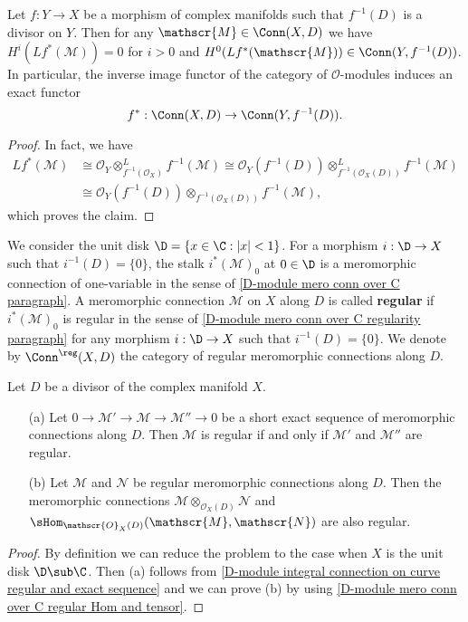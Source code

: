 \begin{proposition}\label{D-module mero conn inverse image exact}
Let $f:Y\to X$ be a morphism of complex manifolds such that $f^{-1}(D)$ is a divisor on $Y$. Then for any $\mathscr{M}\in\Conn(X,D)$ we have $H^i(Lf^*(\mathscr{M}))=0$ for $i>0$ and $H^0(Lf^*(\mathscr{M}))\in\Conn(Y,f^{-1}(D))$. In particular, the inverse image functor of the category of $\mathscr{O}$-modules induces an exact functor
\[f^*:\Conn(X,D)\to\Conn(Y,f^{-1}(D)).\]
\end{proposition}
\begin{proof}
In fact, we have
\begin{align*}
Lf^*(\mathscr{M})&\cong\mathscr{O}_Y\otimes_{f^{-1}(\mathscr{O}_X)}^Lf^{-1}(\mathscr{M})\cong\mathscr{O}_Y(f^{-1}(D))\otimes_{f^{-1}(\mathscr{O}_X(D))}^Lf^{-1}(\mathscr{M})\\
&\cong\mathscr{O}_Y(f^{-1}(D))\otimes_{f^{-1}(\mathscr{O}_X(D))}f^{-1}(\mathscr{M}),
\end{align*}
which proves the claim.
\end{proof}

We consider the unit disk $\D=\{x\in\C:|x|<1\}$. For a morphism $i:\D\to X$ such that $i^{-1}(D)=\{0\}$, the stalk $i^*(\mathscr{M})_0$ at $0\in\D$ is a meromorphic connection of one-variable in the sense of \ref{D-module mero conn over C paragraph}. A meromorphic connection $\mathscr{M}$ on $X$ along $D$ is called \textbf{regular} if $i^*(\mathscr{M})_0$ is regular in the sense of \ref{D-module mero conn over C regularity paragraph} for any morphism $i:\D\to X$ such that $i^{-1}(D)=\{0\}$. We denote by $\Conn^{\reg}(X,D)$ the category of regular meromorphic connections along $D$.

\begin{proposition}\label{D-module mero conn regular prop}
Let $D$ be a divisor of the complex manifold $X$.
\begin{enumerate}
    \item[(a)] Let $0\to\mathscr{M}'\to\mathscr{M}\to\mathscr{M}''\to 0$ be a short exact sequence of meromorphic connections along $D$. Then $\mathscr{M}$ is regular if and only if $\mathscr{M}'$ and $\mathscr{M}''$ are regular.
    \item[(b)] Let $\mathscr{M}$ and $\mathscr{N}$ be regular meromorphic connections along $D$. Then the meromorphic connections $\mathscr{M}\otimes_{\mathscr{O}_X(D)}\mathscr{N}$ and $\sHom_{\mathscr{O}_X(D)}(\mathscr{M},\mathscr{N})$ are also regular.
\end{enumerate}
\end{proposition}
\begin{proof}
By definition we can reduce the problem to the case when $X$ is the unit disk $\D\sub\C$. Then (a) follows from \cref{D-module integral connection on curve regular and exact sequence} and we can prove (b) by using \cref{D-module mero conn over C regular Hom and tensor}.
\end{proof}

